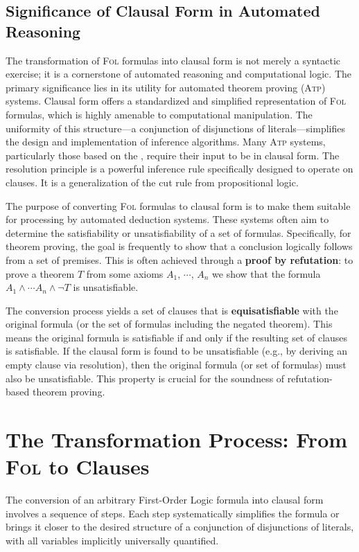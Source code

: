\subsection{Significance of Clausal Form in Automated Reasoning}
The transformation of \textsc{Fol} formulas into clausal form is not merely a syntactic exercise; it is a
cornerstone of automated reasoning and computational logic. The primary significance lies in its utility for
automated theorem proving (\textsc{Atp}) systems. 
Clausal form offers a standardized and simplified representation of \textsc{Fol} formulas, which is highly
amenable to computational manipulation. The uniformity of this structure---a conjunction of disjunctions of
literals---simplifies the design and implementation of inference algorithms. Many \textsc{Atp} systems, particularly
those based on the , require their input to be in clausal form. The resolution
principle is a powerful inference rule specifically designed to operate on clauses.  It is a generalization of
the cut rule from propositional logic.

The purpose of converting \textsc{Fol} formulas to clausal form is to make them suitable for
processing by automated deduction systems. These systems often aim to determine the satisfiability or
unsatisfiability of a set of formulas. Specifically, for theorem proving, the goal is frequently to show that a
conclusion logically follows from a set of premises. This is often achieved through
a \textbf{proof by refutation}: to prove a theorem $T$ from some axioms $A_1$, $\cdots$, $A_n$
we show that the formula $A_1 \land \cdots A_n \land \neg T$ is unsatisfiable.  

The conversion process yields a set of clauses that is \textbf{equisatisfiable} with the original formula (or
the set of formulas including the negated theorem). This means the original formula is satisfiable if and only
if the resulting set of clauses is satisfiable. If the clausal form is found to be unsatisfiable (e.g., by
deriving an empty clause via resolution), then the original formula (or set of formulas) must also be
unsatisfiable. This property is crucial for the soundness of refutation-based theorem proving. 

\section{The Transformation Process: From \textsc{Fol} to Clauses}
The conversion of an arbitrary First-Order Logic formula into clausal form involves a sequence of steps. Each
step systematically simplifies the formula or brings it closer to the desired structure of a conjunction of
disjunctions of literals, with all variables implicitly universally quantified. 

